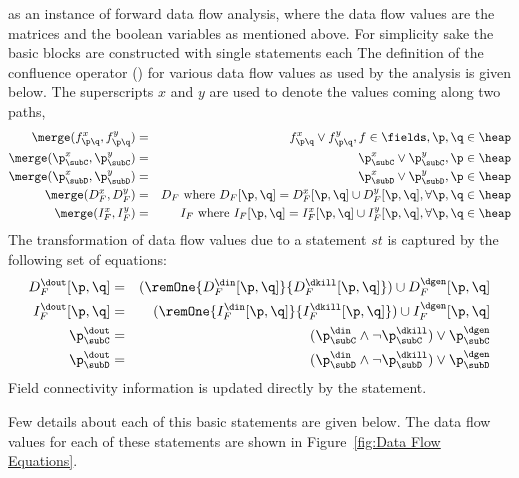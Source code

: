  as an instance of forward data flow analysis,
where the data flow values are the matrices and the boolean
variables as mentioned above.  For simplicity sake the basic blocks
are constructed with single statements each
The definition of 
the confluence operator (\merge) for various data flow values
as used by the analysis is given below. The superscripts $x$ and $y$
are used to denote the values coming along two paths,
\begin{eqnarray*}
  \merge( f_{\p\q}^x, f_{\p\q}^y ) &=& f_{\p\q}^x \vee f_{\p\q}^y , f \in \fields,
  \p,\q \in \heap \\
   \merge(\p_{\subC}^x, \p_{\subC}^y) &=& \p_{\subC}^x \vee
   \p_{\subC}^y, \p \in \heap \\
   \merge(\p_{\subD}^x, \p_{\subD}^y) &=& \p_{\subD}^x \vee
   \p_{\subD}^y, \p \in \heap \\
   \merge(D_F^{x}, D_F^{y}) &=& D_F \mbox{ where }
   D_F[{\p}, {\q}]  = D_F^{x}[{\p}, {\q}] \cup
   D_F^{y}[{\p}, {\q}],   \forall {\p}, {\q} \in \heap\\ 
   \merge(I_F^{x}, I_F^{y}) &=& I_F \mbox{ where }
   I_F[{\p}, {\q}]  = I_F^{x}[{\p}, {\q}] \cup
   I_F^{y}[{\p}, {\q}],   \forall {\p}, {\q} \in \heap
\end{eqnarray*}
The transformation of data flow values due to a statement
$st$ is captured by the following set of equations:
\begin{eqnarray*}
  D_F^{\dout}[\p,\q] &=& (\remOne{D_F^{\din}[\p,\q]}{D_F^{\dkill}[\p,\q]}) \cup
  D_F^{\dgen}[\p,\q] \\
  I_F^{\dout}[\p,\q] &=& (\remOne{I_F^{\din}[\p,\q]}{I_F^{\dkill}[\p,\q]}) \cup
  I_F^{\dgen}[\p,\q] \\
  \p_{\subC}^{\dout} &=& (\p_{\subC}^{\din} \wedge
  \neg\p_{\subC}^{\dkill} ) \vee \p_{\subC}^{\dgen}  \\
  \p_{\subD}^{\dout} &=& (\p_{\subD}^{\din} \wedge
  \neg\p_{\subD}^{\dkill} ) \vee \p_{\subD}^{\dgen} 
\end{eqnarray*}
Field connectivity information is updated directly by the
statement.


Few details about each of this basic statements are given below. The data flow values for each of these statements 
are shown in Figure~\ref{fig:Data Flow Equations}.


